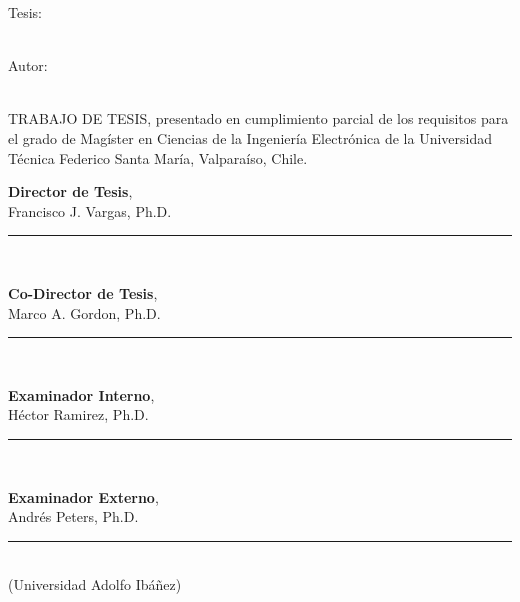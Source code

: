 \setlength{\parindent}{0cm}
\begin{titlepage}
	\begin{singlespacing}
		\large
		Tesis:\\
		\large\textbf{\thesistitle} \\
	\vspace{1cm}
	
		Autor:\\
		\large\textbf{\yourName} \\
	\vspace{1cm}
	
	TRABAJO DE TESIS, presentado en cumplimiento parcial de los requisitos para el grado de Magíster en Ciencias de la Ingeniería Electrónica de la Universidad Técnica Federico Santa María, Valparaíso, Chile.\\
	
	\vspace{1cm}
	
	\textbf{Director de Tesis},\\
	Francisco J. Vargas, Ph.D. \hspace{21mm} \rule{7.5cm}{0.1mm}\\

    \vspace{1cm}
    
    \textbf{Co-Director de Tesis},\\
	Marco A. Gordon, Ph.D. \hspace{24mm} \rule{7.5cm}{0.1mm}\\
	
	\vspace{1cm}
	
	\textbf{Examinador Interno},\\
	Héctor Ramirez, Ph.D. \hspace{26mm} \rule{7.5cm}{0.1mm}\\
	
	\vspace{1cm}
	
	\textbf{Examinador Externo},\\
	Andrés Peters, Ph.D. \hspace{30mm} \rule{7.5cm}{0.1mm}\\
    (Universidad Adolfo Ibáñez)

	\end{singlespacing}
\end{titlepage}